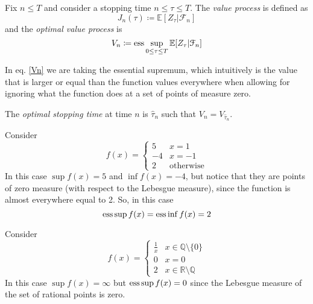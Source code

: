 \begin{definition}
Fix $n\le T$ and consider a stopping time $n\le\tau\le T$. The \emph{value process} is defined as 
\begin{equation}
    J_n(\tau) \coloneqq \mathbb{E}[Z_{\tau}|\mathcal{F}_n]
\end{equation}
and the \emph{optimal value process} is
\begin{equation}\label{Vn}
    V_n \coloneqq \operatorname{ess}\sup_{0\le\tau\le T} \mathbb{E}[Z_{\tau}|\mathcal{F}_n]
\end{equation}
\end{definition}
\noindent In eq. \eqref{Vn} we are taking the essential supremum, which intuitively is the value that is larger or equal than the function values everywhere when allowing for ignoring what the function does at a set of points of measure zero. 
\begin{definition}
The \emph{optimal stopping time} at time $n$ is $\hat{\tau}_n$ such that $V_n=V_{\hat{\tau}_n}$.
\end{definition}
\begin{example}{}{}
Consider 
\begin{equation*}
    f(x)=\begin{cases}
    5 & x=1 \\
    -4 & x=-1 \\
    2 & \mbox{otherwise}
    \end{cases}
\end{equation*}
In this case $\sup f(x)=5$ and $\inf f(x)=-4$, but notice that they are points of zero measure (with respect to the Lebesgue measure), since the function is almost everywhere equal to 2. So, in this case 
\begin{equation*}
    \operatorname{ess}\sup f(x) = \operatorname{ess}\inf f(x) = 2
\end{equation*}
\end{example}
\begin{example}{}{}
Consider 
\begin{equation*}
    f(x)=\begin{cases}
    \frac{1}{x} & x\in\mathbb{Q}\setminus\{0\} \\
    0 & x=0 \\
    2 & x\in\mathbb{R}\setminus\mathbb{Q}
    \end{cases}
\end{equation*}
In this case $\sup f(x)=\infty$ but $\operatorname{ess}\sup f(x)=0$ since the Lebesgue measure of the set of rational points is zero.
\end{example}